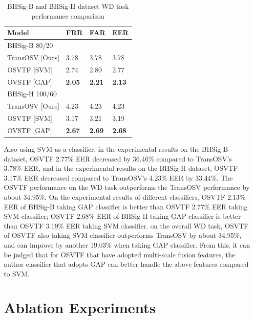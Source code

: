 \begin{table}[htbp]
\caption{BHSig-B and BHSig-H dataset WD task performance comparison}  
\begin{center}
\begin{tabu} to 0.8\textwidth{X[3, l]X[2, l]X[2, l]X[2, l]}  
\toprule
Model & FRR & FAR & EER \\
\midrule
BHSig-B 80/20 \\
TransOSV [Ours] & 3.78 & 3.78 & 3.78 \\
OSVTF [SVM] & 2.74 & 2.80 & 2.77 \\
OVSTF [GAP] & \bf{2.05} & \bf{2.21} & \bf{2.13} \\
\midrule
BHSig-H 100/60 \\
TransOSV [Ours] & 4.23 & 4.23 & 4.23 \\
OSVTF [SVM] & 3.17 & 3.21 & 3.19 \\
OVSTF [GAP] & \bf{2.67} & \bf{2.69} & \bf{2.68} \\
\bottomrule
\end{tabu}
\end{center}
\label{tab:wd}
\end{table}

Also using SVM as a classifier, in the experimental results on the BHSig-B dataset, OSVTF 2.77\% EER decreased by 36.46\% compared to TransOSV's 3.78\% EER, and in the experimental results on the BHSig-H dataset, OSVTF 3.17\% EER decreased compared to TransOSV's 4.23\% EER by 33.44\%. The OSVTF performance on the WD task outperforms the TransOSV performance by about 34.95\%. On the experimental results of different classifiers, OSVTF 2.13\% EER of BHSig-B taking GAP classifier is better than OSVTF 2.77\% EER taking SVM classifier; OSVTF 2.68\% EER of BHSig-H taking GAP classifier is better than OSVTF 3.19\% EER taking SVM classifier. on the overall WD task, OSVTF of OSVTF also taking SVM classifier outperforms TransOSV by about 34.95\%, and can improve by another 19.03\% when taking GAP classifier. From this, it can be judged that for OSVTF that have adopted multi-scale fusion features, the author classifier that adopts GAP can better handle the above features compared to SVM.


\section{Ablation Experiments}

